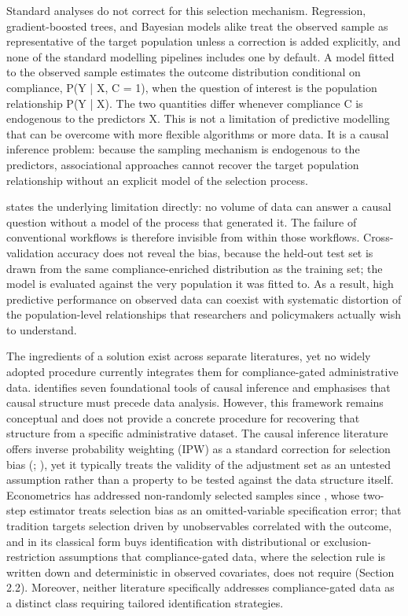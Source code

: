 Standard analyses do not correct for this selection mechanism. Regression, gradient-boosted trees, and Bayesian models alike treat the observed sample as representative of the target population unless a correction is added explicitly, and none of the standard modelling pipelines includes one by default. A model fitted to the observed sample estimates the outcome distribution conditional on compliance, P(Y | X, C = 1), when the question of interest is the population relationship P(Y | X). The two quantities differ whenever compliance C is endogenous to the predictors X. This is not a limitation of predictive modelling that can be overcome with more flexible algorithms or more data. It is a causal inference problem: because the sampling mechanism is endogenous to the predictors, associational approaches cannot recover the target population relationship without an explicit model of the selection process.

 states the underlying limitation directly: no volume of data can answer a causal question without a model of the process that generated it. The failure of conventional workflows is therefore invisible from within those workflows. Cross-validation accuracy does not reveal the bias, because the held-out test set is drawn from the same compliance-enriched distribution as the training set; the model is evaluated against the very population it was fitted to. As a result, high predictive performance on observed data can coexist with systematic distortion of the population-level relationships that researchers and policymakers actually wish to understand.

The ingredients of a solution exist across separate literatures, yet no widely adopted procedure currently integrates them for compliance-gated administrative data.  identifies seven foundational tools of causal inference and emphasises that causal structure must precede data analysis. However, this framework remains conceptual and does not provide a concrete procedure for recovering that structure from a specific administrative dataset. The causal inference literature offers inverse probability weighting (IPW) as a standard correction for selection bias (; ), yet it typically treats the validity of the adjustment set as an untested assumption rather than a property to be tested against the data structure itself. Econometrics has addressed non-randomly selected samples since , whose two-step estimator treats selection bias as an omitted-variable specification error; that tradition targets selection driven by unobservables correlated with the outcome, and in its classical form buys identification with distributional or exclusion-restriction assumptions that compliance-gated data, where the selection rule is written down and deterministic in observed covariates, does not require (Section 2.2). Moreover, neither literature specifically addresses compliance-gated data as a distinct class requiring tailored identification strategies.

